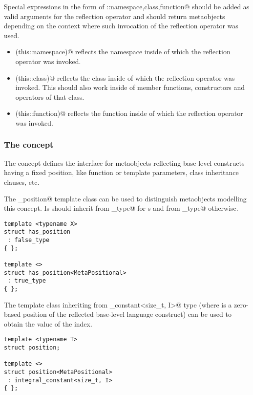 Special expressions in the form of \verb@this::{namespace,class,function}@ should be added
as valid arguments for the reflection operator and should return metaobjects depending
on the context where such invocation of the reflection operator was used.

\begin{itemize}
\item{\verb@mirrored(this::namespace)@} reflects the namespace inside of which the reflection
operator was invoked.
\item{\verb@mirrored(this::class)@} reflects the class inside of which the reflection
operator was invoked. This should also work inside of member functions, constructors and operators
of that class.
\item{\verb@mirrored(this::function)@} reflects the function inside of which the reflection
operator was invoked.
\end{itemize}

\subsubsection{The  concept}

The  concept defines the interface for metaobjects reflecting
base-level constructs having a fixed position, like function or template parameters,
class inheritance clauses, etc.

The \verb@has_position@ template class can be used to distinguish metaobjects modelling
this concept. Is should inherit from \verb@true_type@ for s and from
\verb@false_type@ otherwise.

\begin{verbatim}
template <typename X>
struct has_position
 : false_type
{ };

template <>
struct has_position<MetaPositional>
 : true_type
{ };
\end{verbatim}

The \verb@position@ template class inheriting
from \verb@integral_constant<size_t, I>@ type (where \verb@I@ is
a zero-based position of the reflected base-level language construct)
can be used to obtain the value of the index.

\begin{verbatim}
template <typename T>
struct position;

template <>
struct position<MetaPositional>
 : integral_constant<size_t, I>
{ };
\end{verbatim}

